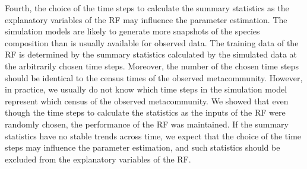 Fourth, the choice of the time steps to calculate the summary statistics as the explanatory variables of the RF may influence the parameter estimation. The simulation models are likely to generate more snapshots of the species composition than is usually available for observed data. The training data of the RF is determined by the summary statistics calculated by the simulated data at the arbitrarily chosen time steps. Moreover, the number of the chosen time steps should be identical to the census times of the observed metacommunity. However, in practice, we usually do not know which time steps in the simulation model represent which census of the observed metacommunity. We showed that even though the time steps to calculate the statistics as the inputs of the RF were randomly chosen, the performance of the RF was maintained. If the summary statistics have no stable trends across time, we expect that the choice of the time steps may influence the parameter estimation, and such statistics should be excluded from the explanatory variables of the RF.

